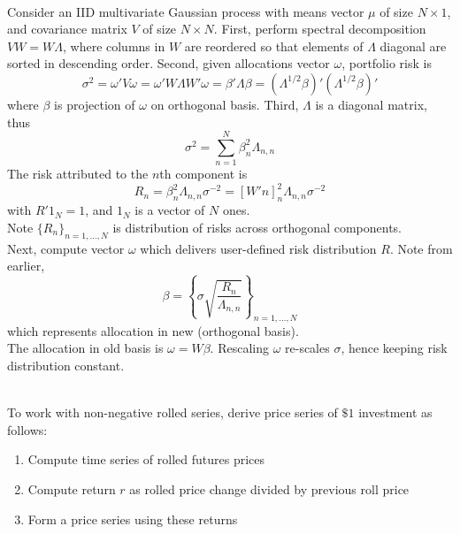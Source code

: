 \documentclass[a4paper,oneside,openany]{book}
\begin{document}
\begin{method} \\
Consider an IID multivariate Gaussian process with means vector $\mu$ of size $N \times 1$, and covariance matrix $V$ of size $N \times N$. First, perform spectral decomposition $VW = W \Lambda$, where columns in $W$ are reordered so that elements of $\Lambda$ diagonal are sorted in descending order. Second, given allocations vector $\omega$, portfolio risk is
\begin{equation*}
\sigma^2 = \omega' V \omega = \omega' W \Lambda W' \omega = \beta' \Lambda \beta = (\Lambda^{1/2} \beta)' (\Lambda^{1/2} \beta)' \nonumber
\end{equation*}
 where $\beta$ is projection of $\omega$ on orthogonal basis. Third, $\Lambda$ is a diagonal matrix, thus
\begin{equation*}
\sigma^2 = \sum\limits_{n=1}^N \beta^2_n \Lambda_{n,n} \nonumber
\end{equation*}
The risk attributed to the $n$th component is
\begin{equation*}
R_n = \beta^2_n \Lambda_{n,n}\sigma^{-2} = [W' n]^2_n \Lambda_{n,n} \sigma^{-2} \nonumber
\end{equation*}
with $R' 1_N = 1$, and $1_N$ is a vector of $N$ ones.\\
Note $\{R_n\}_{n=1, \ldots, N}$ is distribution of risks across orthogonal components.\\
Next, compute vector $\omega$ which delivers user-defined risk distribution $R$. Note from earlier,
\begin{equation*}
\beta = \left\{ \sigma \sqrt{\frac{R_n}{\Lambda_{n,n}}} \right\}_{n = 1, \ldots, N} \nonumber
\end{equation*}
which represents allocation in new (orthogonal basis).\\
The allocation in old basis is $\omega = W \beta$. Rescaling $\omega$ re-scales $\sigma$, hence keeping risk distribution constant.
\end{method}

\begin{method} \\
To work with non-negative rolled series, derive price series of $\$ 1$ investment as follows:
\begin{enumerate}[label=\roman*.]
\setlength{\itemsep}{0pt}
\item Compute time series of rolled futures prices
\item Compute return $r$ as rolled price change divided by previous roll price
\item Form a price series using these returns
\end{enumerate}
\end{method}
\end{document}
